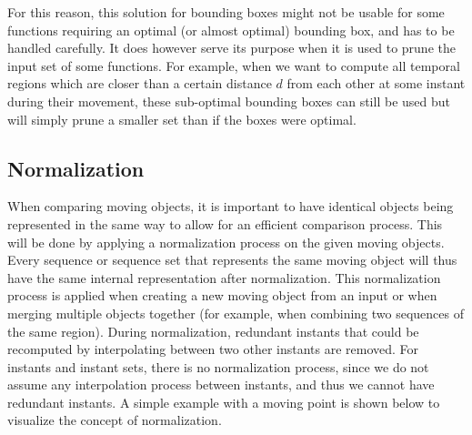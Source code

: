 For this reason, this solution for bounding boxes might not be usable for some functions requiring an optimal (or almost optimal) bounding box, and has to be handled carefully. It does however serve its purpose when it is used to prune the input set of some functions. For example, when we want to compute all temporal regions which are closer than a certain distance $d$ from each other at some instant during their movement, these sub-optimal bounding boxes can still be used but will simply prune a smaller set than if the boxes were optimal.

\subsection{Normalization}
\label{section:normalization}

When comparing moving objects, it is important to have identical objects being represented in the same way to allow for an efficient comparison process. This will be done by applying a normalization process on the given moving objects. Every sequence or sequence set that represents the same moving object will thus have the same internal representation after normalization. This normalization process is applied when creating a new moving object from an input or when merging multiple objects together (for example, when combining two sequences of the same region). During normalization, redundant instants that could be recomputed by interpolating between two other instants are removed. For instants and instant sets, there is no normalization process, since we do not assume any interpolation process between instants, and thus we cannot have redundant instants. A simple example with a moving point is shown below to visualize the concept of normalization.


